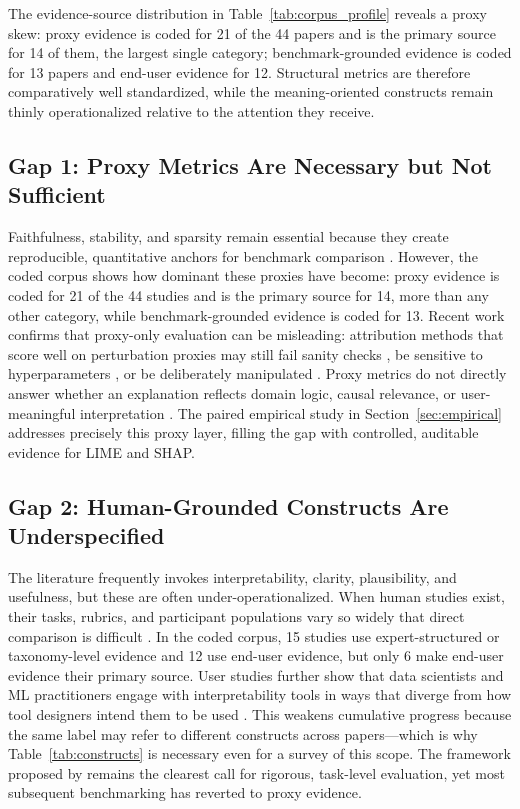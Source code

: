 \documentclass[10pt]{article}
\begin{document}
The evidence-source distribution in Table~\ref{tab:corpus_profile}
reveals a proxy skew: proxy evidence is coded for 21 of the 44 papers and is
the primary source for 14 of them, the largest single category; benchmark-grounded
evidence is coded for 13 papers and end-user evidence for 12. Structural metrics
are therefore comparatively well standardized, while the meaning-oriented
constructs remain thinly operationalized relative to the attention they
receive.

\subsection{Gap 1: Proxy Metrics Are Necessary but Not Sufficient}

Faithfulness, stability, and sparsity remain essential because they create
reproducible, quantitative anchors for benchmark comparison
\citep{agarwal2022openxai,hedstrom2023quantus,canha2025benchmark,
nauta2023anecdotal,burkart2021survey}. However, the coded corpus shows
how dominant these proxies have become: proxy evidence is coded for 21 of the
44 studies and is the primary source for 14, more than any other category,
while benchmark-grounded evidence is coded for 13. Recent work
confirms that proxy-only evaluation can be misleading: attribution
methods that score well on perturbation proxies may still fail sanity
checks \citep{adebayo2018sanity}, be sensitive to hyperparameters
\citep{alvarezmelis2018robustness}, or be deliberately manipulated
\citep{slack2020fooling}. Proxy metrics do not directly answer whether
an explanation reflects domain logic, causal relevance, or
user-meaningful interpretation \citep{kumar2020problems,
doshivelez2017rigorous}. The paired empirical study in
Section~\ref{sec:empirical} addresses precisely this proxy layer,
filling the gap with controlled, auditable evidence for LIME and SHAP.

\subsection{Gap 2: Human-Grounded Constructs Are Underspecified}

The literature frequently invokes interpretability, clarity, plausibility,
and usefulness, but these are often under-operationalized. When human
studies exist, their tasks, rubrics, and participant populations vary so
widely that direct comparison is difficult
\citep{ali2023trustworthy,longo2024manifesto,mohseni2021survey}. In the
coded corpus, 15 studies use expert-structured or taxonomy-level evidence and
12 use end-user evidence, but only 6 make end-user evidence their primary
source. User studies further show that data
scientists and ML practitioners engage with interpretability tools in ways
that diverge from how tool designers intend them to be used
\citep{kaur2020interpreting,hase2020evaluating,bucinca2020proxy}. This
weakens cumulative progress because the same label may refer to different
constructs across papers---which is why Table~\ref{tab:constructs} is
necessary even for a survey of this scope. The framework proposed by
\citet{doshivelez2017rigorous} remains the clearest call for rigorous,
task-level evaluation, yet most subsequent benchmarking has reverted to
proxy evidence.
\end{document}
